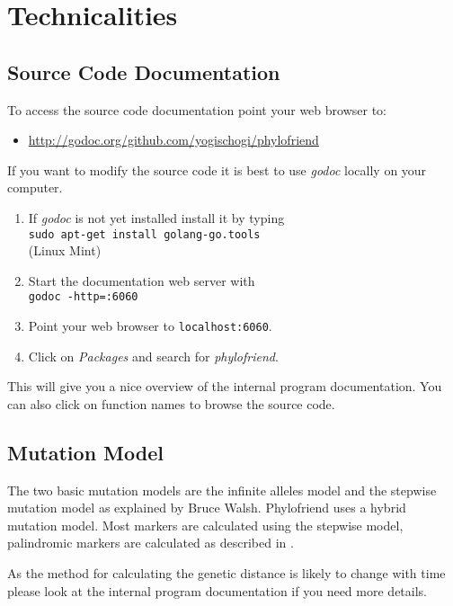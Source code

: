 \section{Technicalities}

\subsection{Source Code Documentation}

To access the source code documentation point your
web browser to:

\begin{itemize}
\item \href{http://godoc.org/github.com/yogischogi/phylofriend}{http://godoc.org/github.com/yogischogi/phylofriend}
\end{itemize}

If you want to modify the source code it is best to
use \emph{godoc} locally on your computer.

\begin{enumerate}
\item If \emph{godoc} is not yet installed install it by typing\\
	\texttt{sudo apt-get install golang-go.tools}\\
	(Linux Mint)
\item Start the documentation web server with\\
	\texttt{godoc -http=:6060}
\item Point your web browser to \texttt{localhost:6060}.
\item Click on \emph{Packages} and search for \emph{phylofriend}.
\end{enumerate}

This will give you a nice overview of the internal program
documentation. You can also click on function names to browse
the source code.


\subsection{Mutation Model}

The two basic mutation models are the infinite alleles model
and the stepwise mutation model as explained by Bruce Walsh\cite{Wal02}.
Phylofriend uses a hybrid mutation model. Most markers are
calculated using the stepwise model, palindromic markers are
calculated as described in \cite{Can14}.

As the method for calculating the genetic distance is likely
to change with time please look at the internal program
documentation if you need more details.


